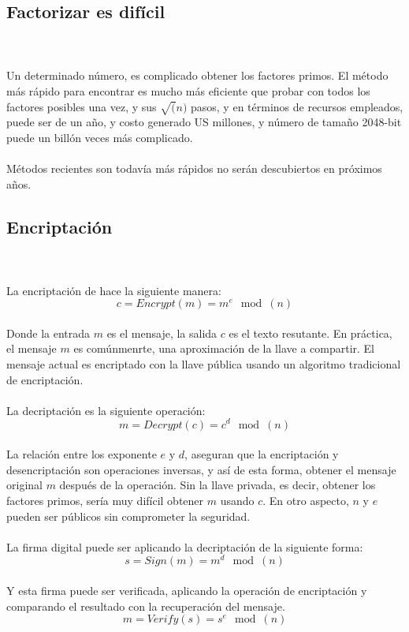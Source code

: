 \documentclass[12pt, a4paper]{article}
\begin{document}
	\subsection{Factorizar es difícil}
	\\
	\\Un determinado número, es complicado obtener los factores primos. El método más rápido para encontrar es mucho más eficiente que probar con todos los factores posibles una vez, y sus $\sqrt(n)$ pasos, y en términos de recursos empleados, puede ser de un año, y costo generado US  millones, y número de tamaño 2048-bit puede un billón veces más complicado.
	\\
	\\Métodos recientes son todavía más rápidos no serán descubiertos en próximos años.

	\subsection{Encriptación}
	\\
	\\La encriptación de hace la siguiente manera:
	\\$$c=Encrypt(m)=m^{e}\mod(n)$$
	\\Donde la entrada $m$ es el mensaje, la salida $c$ es el texto resutante. En práctica, el mensaje $m$ es comúnmenrte, una aproximación de la llave a compartir. El mensaje actual es encriptado con la llave pública usando un algoritmo tradicional de encriptación.
	\\
	\\La decriptación es la siguiente operación:
	\\$$m=Decrypt(c)=c^{d}\mod(n)$$
	\\La relación entre los exponente $e$ y $d$, aseguran que la encriptación y desencriptación son operaciones inversas, y así de esta forma, obtener el mensaje original $m$ después de la operación. Sin la llave privada, es decir, obtener los factores primos, sería muy difícil obtener $m$ usando $c$. En otro aspecto, $n$ y $e$ pueden ser públicos sin comprometer la seguridad.
	\\
	\\La firma digital puede ser aplicando la decriptación de la siguiente forma:
	\\$$s=Sign(m)=m^{d}\mod(n)$$
	\\Y esta firma puede ser verificada, aplicando la operación de encriptación y comparando el resultado con la recuperación del mensaje.
	\\$$m=Verify(s)=s^{e}\mod(n)$$
\end{document}
